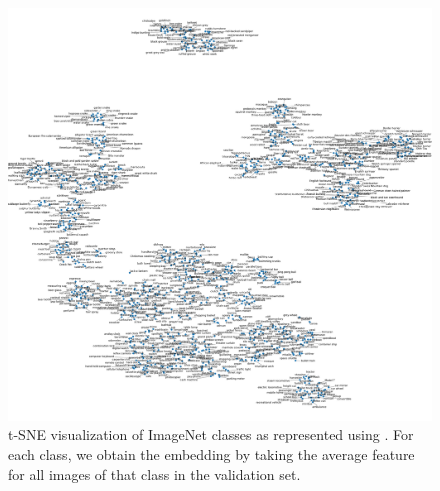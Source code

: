 \begin{figure}[t]
\centering
\includegraphics[width=\linewidth]{tsne-classes.pdf}
  \caption{
    t-SNE visualization of ImageNet classes as represented using \OURS.
    For each class, we obtain the embedding by taking the average feature for all images of that class in the validation set.
  }
  \label{fig:tsne}
\end{figure}
